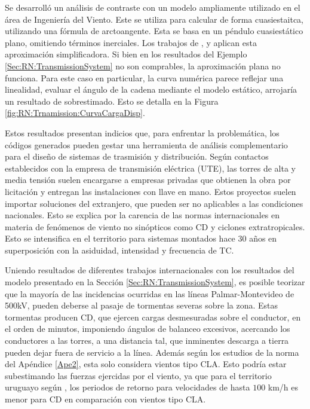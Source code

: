 Se desarrolló un análisis de contraste con un modelo ampliamente utilizado en el área de Ingeniería del Viento. Este se utiliza para calcular de forma cuasiestaitca, utilizando una fórmula de arctoangente. Esta se basa en un péndulo cuasiestático plano, omitiendo términos inerciales. Los trabajos de \cite{stengel2017measurements}, \cite{duranona2009analysis} y \cite{yan2009numerical} aplican esta aproximación simplificadora. Si bien en los resultados del Ejemplo \ref{Sec:RN:TransmissionSystem} no son comprables, la aproximación plana no funciona. Para este caso en particular, la curva numérica parece reflejar una linealidad, evaluar el ángulo de la cadena mediante el modelo estático, arrojaría un resultado de sobrestimado. Esto se detalla en la Figura \ref{fig:RN:Trnamission:CurvaCargaDisp}.

Estos resultados presentan indicios que, para enfrentar la problemática, los códigos generados pueden gestar una herramienta de análisis complementario para el diseño de sistemas de trasmisión y distribución. Según contactos establecidos con la empresa de transmisión eléctrica (UTE), las torres de alta y media tensión suelen encargarse a empresas privadas que obtienen la obra por licitación y entregan las instalaciones con llave en mano. Estos proyectos suelen importar soluciones del extranjero, que pueden ser no aplicables a las condiciones nacionales. Esto se explica por la carencia de las normas internacionales en materia de fenómenos de viento no sinópticos como CD y ciclones extratropicales. Esto se intensifica en el territorio para sistemas montados hace 30 años en superposición con la asiduidad, intensidad y frecuencia de TC. 

Uniendo resultados de diferentes trabajos internacionales con los resultados del modelo presentado en la Sección \ref{Sec:RN:TransmissionSystem}, es posible teorizar que la mayoría de las incidencias ocurridas en las líneas Palmar-Montevideo de 500kV, pueden deberse al pasaje de tormentas severas sobre la zona. Estas tormentas producen CD, que ejercen cargas desmesuradas sobre el conductor, en el orden de minutos, imponiendo ángulos de balanceo excesivos, acercando los conductores a las torres, a una distancia tal, que inminentes descarga a tierra pueden dejar fuera de servicio a la línea. Además según los estudios de la norma \cite{IEC60826} del Apéndice \ref{Ape2}, esta solo considera vientos tipo CLA. Esto podría estar subestimando las fuerzas ejercidas por el viento, ya que para el territorio uruguayo según \cite{Duranona2018}, los periodos de retorno para velocidades de hasta $100$ km/h es menor para CD en comparación con vientos tipo CLA. 




